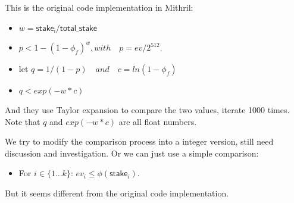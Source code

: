 \documentclass{article}
\begin{document}
This is the original code implementation in Mithril:

\begin{itemize}
    \item $w = \mathsf{stake_i} / \mathsf{total\_stake}$
    \item $p < 1 - (1 - \phi_f)^w, with\quad p = ev / 2^{512}$.
    \item let $q = 1 / (1 - p) \quad and\quad c = ln(1 - \phi_f)$
    \item $q < exp(-w * c)$
\end{itemize}

And they use Taylor expansion to compare the two values, iterate 1000 times. Note that $q$ and  $exp(-w * c)$ are all float numbers.


We try to modify the comparison process into a integer version, still need discussion and investigation. Or we can just use a simple comparison:

\begin{itemize}
    \item For $i \in \{1 \dots k\}$: $ev_i \leq \phi(\mathsf{stake}_i)$.
\end{itemize}

But it seems different from the original code implementation.
\end{document}

